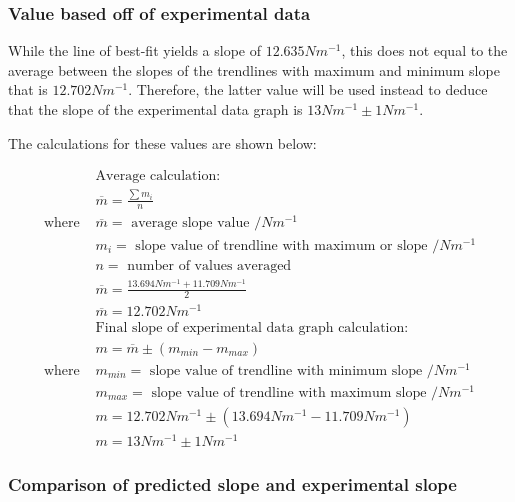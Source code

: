 \documentclass[letterpaper, 12pt]{article}
\begin{document}
\subsubsection{Value based off of experimental data}

While the line of best-fit yields a slope of $12.635\unit{Nm^{-1}}$,
this does not equal to the average between the slopes of the trendlines
with maximum and minimum slope that is $12.702\unit{Nm^{-1}}$. Therefore,
the latter value will be used instead to deduce that the slope of the
experimental data graph is $13\unit{Nm^{-1}} \pm 1\unit{Nm^{-1}}$.

The calculations for these values are shown below:

\begin{align*}
                  & \text{Average calculation:}
    \\
                  & \overline{m} = \frac{\sum m_i}{n}
    \\
    \text{where } & \overline{m} = \text{ average slope value } /\unit{Nm^{-1}}
    \\ & m_i = \text{ slope value of trendline with maximum or slope } /\unit{Nm^{-1}}
    \\ & n = \text{ number of values averaged }
    \\
                  & \overline{m} = \frac{13.694\unit{Nm^{-1}} + 11.709\unit{Nm^{-1}}}{2}
    \\
                  & \overline{m} = 12.702\unit{Nm^{-1}}
    \\
                  & \text{Final slope of experimental data graph calculation:}
    \\
                  & m = \overline{m} \pm (m_{min} - m_{max})
    \\
    \text{where } & m_{min} = \text{ slope value of trendline with minimum slope } /\unit{Nm^{-1}}
    \\ & m_{max} = \text{ slope value of trendline with maximum slope } /\unit{Nm^{-1}}
    \\
                  & m = 12.702\unit{Nm^{-1}} \pm (13.694\unit{Nm^{-1}} - 11.709\unit{Nm^{-1}})
    \\
                  & m = 13\unit{Nm^{-1}} \pm 1\unit{Nm^{-1}}
\end{align*}

\subsubsection{Comparison of predicted slope and experimental slope}
\end{document}
